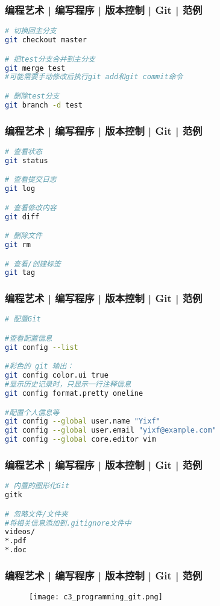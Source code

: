 \begin{frame}[fragile]
  \frametitle{编程艺术 | 编写程序 | 版本控制 | Git | \alert{范例}}
\begin{lstlisting}[language=sh]
# 切换回主分支
git checkout master

# 把test分支合并到主分支
git merge test
#可能需要手动修改后执行git add和git commit命令

# 删除test分支
git branch -d test
\end{lstlisting}
\end{frame}

\begin{frame}[fragile]
  \frametitle{编程艺术 | 编写程序 | 版本控制 | Git | \alert{范例}}
  \vspace{-1.5em}
\begin{lstlisting}[language=sh]
# 查看状态
git status

# 查看提交日志
git log

# 查看修改内容
git diff

# 删除文件
git rm

# 查看/创建标签
git tag
\end{lstlisting}
\end{frame}

\begin{frame}[fragile]
  \frametitle{编程艺术 | 编写程序 | 版本控制 | Git | 范例}
  \vspace{-1.5em}
\begin{lstlisting}[language=sh]
# 配置Git

#查看配置信息
git config --list

#彩色的 git 输出：
git config color.ui true
#显示历史记录时，只显示一行注释信息
git config format.pretty oneline

#配置个人信息等
git config --global user.name "Yixf"
git config --global user.email "yixf@example.com"
git config --global core.editor vim
\end{lstlisting}
\end{frame}

\begin{frame}[fragile]
  \frametitle{编程艺术 | 编写程序 | 版本控制 | Git | 范例}
\begin{lstlisting}[language=sh]
# 内置的图形化Git
gitk

# 忽略文件/文件夹
#将相关信息添加到.gitignore文件中
videos/
*.pdf
*.doc
\end{lstlisting}
\end{frame}

\begin{frame}
  \frametitle{编程艺术 | 编写程序 | 版本控制 | Git | \alert{范例}}
  \begin{figure}
    \centering
    \texttt{[image: c3\_programming\_git.png]}
  \end{figure}
\end{frame}

